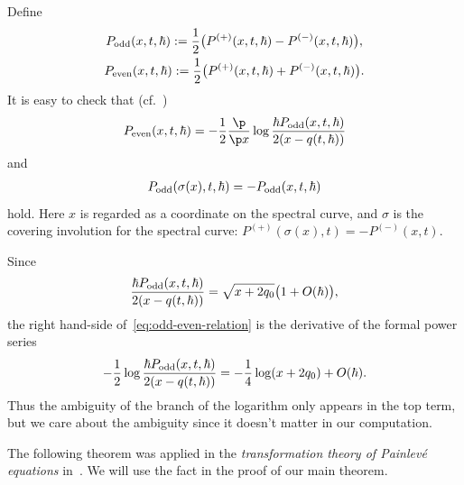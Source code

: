 Def\/ine
\begin{gather*}
P_{\rm odd}(x,t,\hbar)   :=   \frac{1}{2}
\big( P^{(+)}(x,t,\hbar) - P^{(-)}(x,t,\hbar) \big), \\
P_{\rm even}(x,t,\hbar)   :=   \frac{1}{2}
\big( P^{(+)}(x,t,\hbar) + P^{(-)}(x,t,\hbar) \big).
\end{gather*}
It is easy to check that (cf.~\cite[Section~2]{KT05})
\begin{gather} \label{eq:odd-even-relation}
P_{\rm even}(x,t,\hbar) =
-\frac{1}{2}\frac{\p}{\p x}
\log \frac{ \hbar P_{\rm odd}(x,t,\hbar)}
{2(x-q(t,\hbar))}
\end{gather}
and
\begin{gather} \label{eq:parity}
P_{\rm odd}(\sigma(x),t,\hbar) = - P_{\rm odd}(x,t,\hbar)
\end{gather}
hold. Here $x$ is regarded as a coordinate on the spectral curve,
and $\sigma$ is the covering involution for the spectral curve:
$P^{(+)}(\sigma(x),t) = - P^{(-)}(x,t)$.

Since
\begin{gather*}
\frac{ \hbar P_{\rm odd}(x,t,\hbar)}{2(x-q(t,\hbar))} =
\sqrt{x+2q_{0}} \big( 1 + O(\hbar) \big),
\end{gather*}
the right hand-side of~\eqref{eq:odd-even-relation}
is the derivative of the formal power series
\begin{gather*}
-\frac{1}{2}\log\frac{ \hbar P_{\rm odd}(x,t,\hbar)}{2(x-q(t,\hbar))} =
-\frac{1}{4}\log(x+2q_{0}) + O(\hbar).
\end{gather*}
Thus the ambiguity of the branch of the logarithm
only appears in the top term, but
we care about the ambiguity since
it doesn't matter in our computation.


The following theorem was applied in the
{\it transformation theory of Painlev\'e equations}
in~\cite{KT-PI}. We will use the fact
in the proof of our main theorem.

